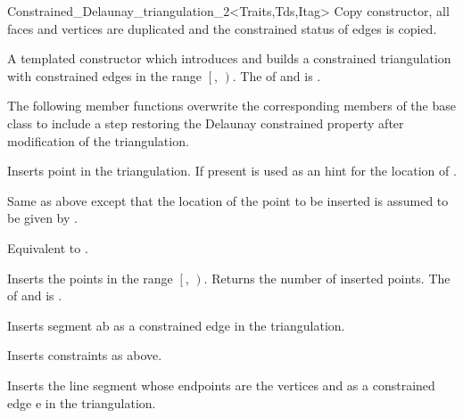 \begin{ccRefClass}{Constrained_Delaunay_triangulation_2<Traits,Tds,Itag>}
 {Copy constructor, all faces and vertices
are duplicated and  the constrained status of edges
is copied.}


{A templated constructor which introduces and builds
 a constrained triangulation with constrained edges in the range 
$\left[\right.$, $\left.\right)$.
\ccPrecond The  of  and 
 is .}



The following member functions overwrite the corresponding
members of the base class to include a step restoring
 the Delaunay constrained
property after modification of the triangulation.

{ Inserts point  in the triangulation. 
If present  is used as an hint
for the location of .}

{Same as above except that the location of the point
  to be inserted is assumed to be given by
.}

{Equivalent to .}

{Inserts the points in the range
 $\left[\right.$, $\left.\right)$.
 Returns the number of inserted points.
 \ccPrecond The  of  and 
 is .}

{ Inserts segment ab as a constrained edge in the triangulation. }

{Inserts constraints  as above.}


{ Inserts the line segment whose endpoints are the vertices  and
 as a constrained  edge e in the triangulation. }



\end{ccRefClass}
